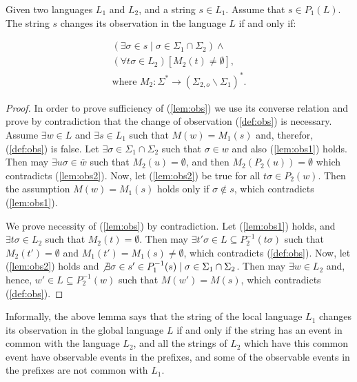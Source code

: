 \begin{lemma}
\label{lem_changed_observation}
Given two languages $L_1$ and $L_2$, and a string $s \in L_1$.
Assume that $s \in P_1(L)$. The string $s$ changes its observation in the
language $L$ if and only if:
\end{lemma}
\begin{subequations}\label{lem:obs}
\begin{align}
	(\exists \sigma \in s \mid \sigma \in \Sigma_1 \cap \Sigma_2) \land
	\label{lem:obs1}
	\\
	(\forall t\sigma \in L_2)
	\left[M_2(t) \neq \emptyset \right],
	\label{lem:obs2}
	\\
	\textrm{where } M_2: \Sigma^* \rightarrow (\Sigma_{2,o} \backslash
	\Sigma_1)^*. 
	\label{lem:obs3}
\end{align}
\end{subequations}

\begin{proof}
In order to prove sufficiency of (\ref{lem:obs}) we use its converse relation
and prove by contradiction that the change of observation (\ref{def:obs}) is
necessary.
Assume $\exists w \in L$ and $\exists s \in L_1$ such that
$M(w)= M_1(s)$ and, therefor, (\ref{def:obs}) is false. Let $\exists
\sigma \in \Sigma_1 \cap \Sigma_2$ such that $\sigma \in w$ and also
(\ref{lem:obs1}) holds. Then may $\exists u \sigma \in \overline{w}$ such that
$M_2(u) = \emptyset$, and then $M_2(P_2(u)) =
\emptyset$ which contradicts (\ref{lem:obs2}). Now, let (\ref{lem:obs2})
be true for all $t\sigma \in P_2(w)$. Then the assumption $M(w)=
M_1(s)$ holds only if $\sigma \not \in s$, which contradicts (\ref{lem:obs1}). 

We prove necessity of (\ref{lem:obs}) by contradiction.
Let (\ref{lem:obs1}) holds, and $\exists t\sigma \in L_2$ such that
$M_2(t) = \emptyset$. Then may $\exists t'\sigma \in 
L \subseteq P_2^{-1}(t\sigma)$ such that $M_2(t') =
\emptyset$ and $M_1(t') = M_1(s) \neq \emptyset$, which contradicts
(\ref{def:obs}).
Now, let (\ref{lem:obs2}) holds and $\not \exists \sigma \in s' \in P_1^{-1}(s)
\mid \sigma \in \Sigma_1 \cap \Sigma_2$. Then may $\exists w \in L_2$ and,
hence, $w' \in L \subseteq P_2^{-1}(w)$ such that $M(w')=M(s)$,
which contradicts (\ref{def:obs}).
\end{proof}

Informally, the above lemma says that the string of the local language $L_1$
changes its observation in the global language $L$ if and only if the string has
an event in common with the language $L_2$, and all the strings of $L_2$ which
have this common event have observable events in the prefixes, and some of the
observable events in the prefixes are not common with $L_1$.

